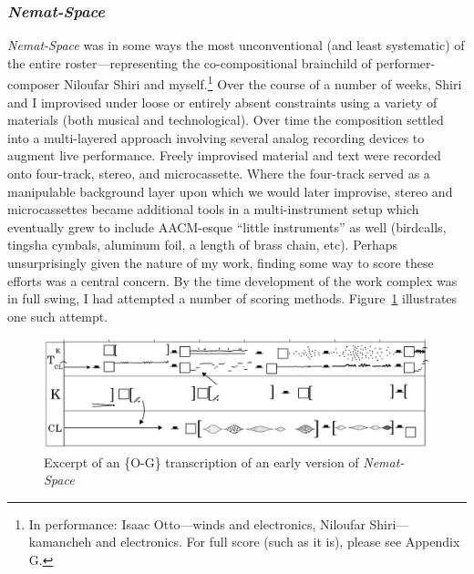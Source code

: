     \subsubsection{\textit{Nemat-Space}}

    \textit{Nemat-Space} was in some ways the most unconventional (and least systematic) of the entire roster---representing the co-compositional brainchild of performer-composer Niloufar Shiri and myself.\footnote{In performance: Isaac Otto---winds and electronics, Niloufar Shiri---kamancheh and electronics. For full score (such as it is), please see Appendix G.} Over the course of a number of weeks, Shiri and I improvised under loose or entirely absent constraints using a variety of materials (both musical and technological). Over time the composition settled into a multi-layered approach involving several analog recording devices to augment live performance. Freely improvised material and text were recorded onto four-track, stereo, and microcassette. Where the four-track served as a manipulable background layer upon which we would later improvise, stereo and microcassettes became additional tools in a multi-instrument setup which eventually grew to include AACM-esque ``little instruments'' as well (birdcalls, tingsha cymbals, aluminum foil, a length of brass chain, etc). Perhaps unsurprisingly given the nature of my work, finding some way to score these efforts was a central concern. By the time development of the work complex was in full swing, I had attempted a number of scoring methods. Figure~\ref{fig:nemat2} illustrates one such attempt.
    
        \begin{figure}[H]
            \centering
            \includegraphics[width=.9\textwidth]{images/chapter4/niloufar_score_long_ex.png}
            \captionsetup{width=.5\textwidth}
            \caption{Excerpt of an \{O-G\} transcription of an early version of \textit{Nemat-Space}}
            \label{fig:nemat2}
        \end{figure}

